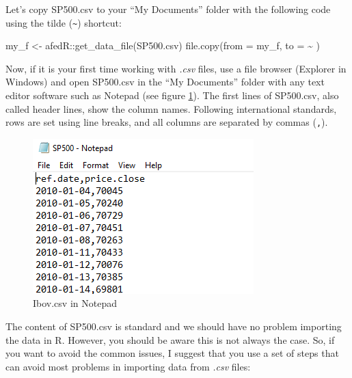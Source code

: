 \documentclass[
  12pt,
]{book}
\newenvironment{Shaded}{\begin{snugshade}}{\end{snugshade}}
\newcommand{\AttributeTok}[1]{\textcolor[rgb]{0.61,0.61,0.61}{#1}}
\newcommand{\FunctionTok}[1]{\textcolor[rgb]{0,0,0}{#1}}
\newcommand{\NormalTok}[1]{#1}
\newcommand{\OtherTok}[1]{\textcolor[rgb]{0.37,0.37,0.37}{#1}}
\newcommand{\SpecialCharTok}[1]{\textcolor[rgb]{0,0,0}{#1}}
\newcommand{\StringTok}[1]{\textcolor[rgb]{0.5,0.5,0.5}{#1}}
\begin{document}
Let's copy SP500.csv to your ``My Documents'' folder with the following code using the tilde (\texttt{\textasciitilde{}}) shortcut:

\begin{Shaded}
\begin{Highlighting}[]
\NormalTok{my\_f }\OtherTok{\textless{}{-}}\NormalTok{ afedR}\SpecialCharTok{::}\FunctionTok{get\_data\_file}\NormalTok{(}\StringTok{\textquotesingle{}SP500.csv\textquotesingle{}}\NormalTok{)}
\FunctionTok{file.copy}\NormalTok{(}\AttributeTok{from =}\NormalTok{ my\_f, }\AttributeTok{to =} \StringTok{\textquotesingle{}\textasciitilde{}\textquotesingle{}}\NormalTok{ )}
\end{Highlighting}
\end{Shaded}

Now, if it is your first time working with \emph{.csv} files, use a file browser (Explorer in Windows) and open SP500.csv in the ``My Documents'' folder with any text editor software such as Notepad (see figure \ref{fig:notepad}). The first lines of SP500.csv, also called header lines, show the column names. Following international standards, rows are set using line breaks, and all columns are separated by commas (\texttt{,}).

\begin{figure}[!htbp]

{\centering \includegraphics[width=1\linewidth]{figs/example_csv_notepad} 

}

\caption{Ibov.csv in Notepad}\label{fig:notepad}
\end{figure}

The content of SP500.csv is standard and we should have no problem importing the data in R. However, you should be aware this is not always the case. So, if you want to avoid the common issues, I suggest that you use a set of steps that can avoid most problems in importing data from \emph{.csv} files:
\end{document}
